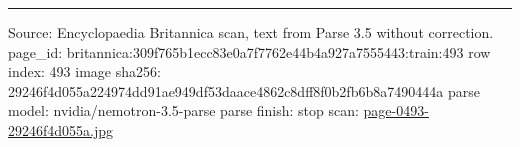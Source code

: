 \documentclass[10pt]{article}
\begin{document}
\vfill\par\noindent\rule{\linewidth}{0.4pt}\par
{\scriptsize\color{gray}\noindent Source: Encyclopaedia Britannica scan, text from Parse 3.5 without correction. page\_id: britannica:309f765b1ecc83e0a7f7762e44b4a927a7555443:train:493 \quad row index: 493 \quad image sha256: 29246f4d055a224974dd91ae949df53daace4862c8dff8f0b2fb6b8a7490444a \quad parse model: nvidia/nemotron-3.5-parse \quad parse finish: stop \quad scan: \href{../scans/page-0493-29246f4d055a.jpg}{page-0493-29246f4d055a.jpg}\par}
\end{document}
